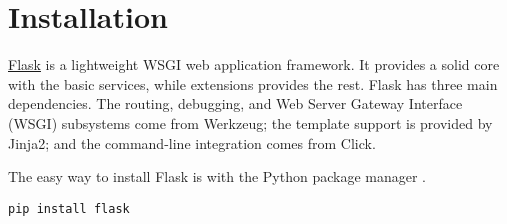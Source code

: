 
\chapter{Installation}
\label{cha:installation}

\href{https://palletsprojects.com/p/flask/}{Flask} is a lightweight WSGI web application framework.
It provides a solid core with the basic services, while extensions provides the rest.
Flask has three main dependencies.
The routing, debugging, and Web Server Gateway Interface (WSGI) subsystems come from Werkzeug; the template support is provided by Jinja2; and the command-line integration comes from Click.

The easy way to install Flask is with the Python package manager .
\begin{lstlisting}
pip install flask
\end{lstlisting}



